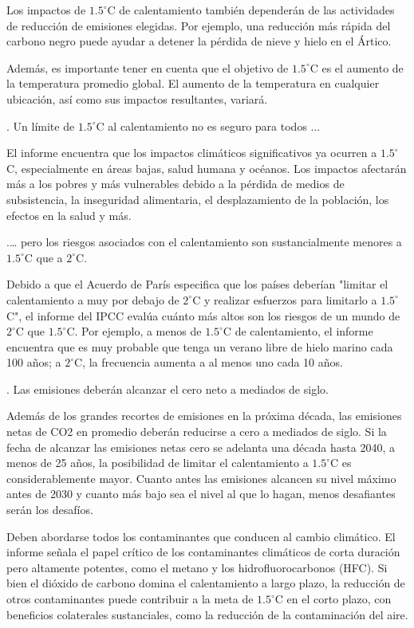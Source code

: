 \documentclass[12pt,a4paper]{article}
\begin{document}
\noindent Los impactos de $1.5^{\circ} $C de calentamiento también dependerán de las actividades de reducción de emisiones elegidas. Por ejemplo, una reducción más rápida del carbono negro puede ayudar a detener la pérdida de nieve y hielo en el Ártico.

\noindent Además, es importante tener en cuenta que el objetivo de $1.5^{\circ} $C es el aumento de la temperatura promedio global. El aumento de la temperatura en cualquier ubicación, así como sus impactos resultantes, variará.

. Un límite de $1.5^{\circ} $C al calentamiento no es seguro para todos ...

\noindent El informe encuentra que los impactos climáticos significativos ya ocurren a $1.5^{\circ} $C, especialmente en áreas bajas, salud humana y océanos. Los impactos afectarán más a los pobres y más vulnerables debido a la pérdida de medios de subsistencia, la inseguridad alimentaria, el desplazamiento de la población, los efectos en la salud y más.

.… pero los riesgos asociados con el calentamiento son sustancialmente menores a $1.5^{\circ} $C que a $2^{\circ} $C.

\noindent Debido a que el Acuerdo de París especifica que los países deberían "limitar el calentamiento a muy por debajo de $2^{\circ} $C y realizar esfuerzos para limitarlo a $1.5^{\circ} $C", el informe del IPCC evalúa cuánto más altos son los riesgos de un mundo de $2^{\circ} $C que $1.5^{\circ} $C. Por ejemplo, a menos de $1.5^{\circ} $C de calentamiento, el informe encuentra que es muy probable que tenga un verano libre de hielo marino cada 100 años; a $2^{\circ} $C, la frecuencia aumenta a al menos uno cada 10 años.

. Las emisiones deberán alcanzar el cero neto a mediados de siglo.

\noindent Además de los grandes recortes de emisiones en la próxima década, las emisiones netas de CO2 en promedio deberán reducirse a cero a mediados de siglo. Si la fecha de alcanzar las emisiones netas cero se adelanta una década hasta 2040, a menos de 25 años, la posibilidad de limitar el calentamiento a $1.5^{\circ} $C es considerablemente mayor. Cuanto antes las emisiones alcancen su nivel máximo antes de 2030 y cuanto más bajo sea el nivel al que lo hagan, menos desafiantes serán los desafíos.

\noindent Deben abordarse todos los contaminantes que conducen al cambio climático. El informe señala el papel crítico de los contaminantes climáticos de corta duración pero altamente potentes, como el metano y los hidrofluorocarbonos (HFC). Si bien el dióxido de carbono domina el calentamiento a largo plazo, la reducción de otros contaminantes puede contribuir a la meta de $1.5^{\circ} $C en el corto plazo, con beneficios colaterales sustanciales, como la reducción de la contaminación del aire.
\end{document}
